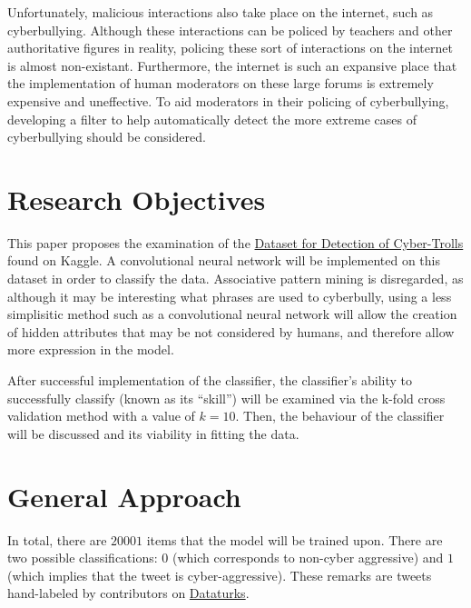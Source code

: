 \documentclass[12pt, letterpaper]{article}
\begin{document}
Unfortunately, malicious interactions also take place on the internet, such as
cyberbullying. Although these interactions can be policed by teachers and other
authoritative figures in reality, policing these sort of interactions on the
internet is almost non-existant. Furthermore, the internet is such an expansive
place that the implementation of human moderators on these large forums is
extremely expensive and uneffective. To aid moderators in their policing of
cyberbullying, developing a filter to help automatically detect the more
extreme cases of cyberbullying should be considered.

\section{Research Objectives} %
This paper proposes the examination of the
\href{https://www.kaggle.com/dataturks/dataset-for-detection-of-cybertrolls}
{Dataset for Detection of Cyber-Trolls} found on Kaggle. A convolutional
neural network will be implemented on this dataset in order to classify the
data. Associative pattern mining is disregarded, as although it may be
interesting what phrases are used to cyberbully, using a less simplisitic
method such as a convolutional neural network will allow the creation of
hidden attributes that may be not considered by humans, and therefore allow
more expression in the model.

After successful implementation of the classifier, the classifier's ability to
successfully classify (known as its ``skill'') will be examined via the
k-fold cross validation method with a value of $k=10$. Then, the behaviour of
the classifier will be discussed and its viability in fitting the data.

\section{General Approach} %
In total, there are $20001$ items that the model will be trained upon. There
are two possible classifications: $0$ (which corresponds to non-cyber
aggressive) and $1$ (which implies that the tweet is cyber-aggressive). These
remarks are tweets hand-labeled by contributors on
\href{https://dataturks.com/projects/abhishek.narayanan/Dataset%20for%20Detection%20of%20Cyber-Trolls}
{Dataturks}.
\end{document}

